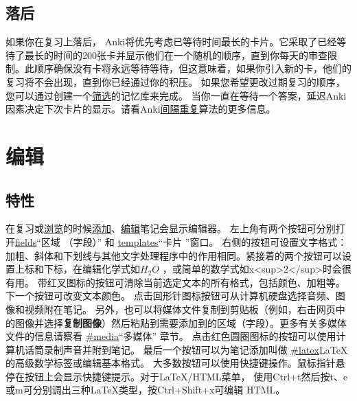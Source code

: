 \documentclass[a4paper]{book}
\begin{document}
	\section{落后}
	
	如果你在复习上落后， Anki将优先考虑已等待时间最长的卡片。它采取了已经等待了最长的时间的200张卡并显示他们在一个随机的顺序，直到你每天的审查限制。此顺序确保没有卡将永远等待等待，但这意味着，如果你引入新的卡，他们的复习将不会出现，直到你已经通过你的积压。
	如果您希望更改过期复习的顺序，您可以通过创建一个\hyperref[filtered]{筛选}的记忆库来完成。
	当你一直在等待一个答案，延迟Anki因素决定下次卡片的显示。请看Anki\hyperref[whatalgorithm]{间隔重复}算法的更多信息。
	
	
	\chapter{编辑}\label{editor}
	
	\section{特性}
	在复习或\hyperref[browser]{浏览}的时候\hyperref[addingnotes]{添加}、\hyperref[editmore]{编辑}笔记会显示编辑器。
	左上角有两个按钮可分别打开\url{fields}“区域
	（字段）” 和
	\url{templates}“卡片
	”窗口。
	右侧的按钮可设置文字格式：加粗、斜体和下划线与其他文字处理程序中的作用相同。紧接着的两个按钮可以设置上标和下标，在编辑化学式如$H_2O$ ，或简单的数学式如x<sup>2</sup>时会很有用。
	带红叉图标的按钮可清除当前选定文本的所有格式，包括颜色、加粗等。
	下一个按钮可改变文本颜色。
	点击回形针图标按钮可从计算机硬盘选择音频、图像和视频附在笔记。 另外，也可以将媒体文件复制到剪贴板（例如，右击网页中的图像并选择\textbf{复制图像}）然后粘贴到需要添加到的区域（字段）。更多有关多媒体文件的信息请察看
	\url{#media}“多媒体” 章节。
	点击红色圆圈图标的按钮可以使用计算机话筒录制声音并附到笔记。
	最后一个按钮可以为笔记添加叫做
	\url{#latex}\LaTeX{}的高级数学标签或编辑基本格式。
	大多数按钮可以使用快捷键操作。鼠标指针悬停在按钮上会显示快捷键提示。对于\LaTeX{}/HTML菜单， 使用Ctrl+t然后按t、e或m可分别调出三种\LaTeX{}类型，按Ctrl+Shift+x可编辑 HTML。
\end{document}
